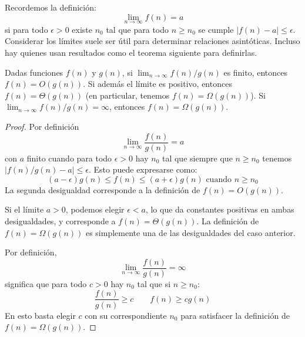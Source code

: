   Recordemos la definición:
  \begin{equation*}
    \lim_{n \rightarrow \infty} f(n) = a
  \end{equation*}
  si para todo \(\epsilon > 0\) existe \(n_0\)
  tal que para todo \(n \ge n_0\)
  se cumple \(\lvert f(n) - a \rvert \le \epsilon\).
  Considerar los límites suele ser útil
  para determinar relaciones asintóticas.
  Incluso hay quienes usan resultados como el teorema siguiente
  para definirlas.
  \begin{theorem}
    \label{theo:limite-O-Omega}
    Dadas funciones \(f(n)\) y \(g(n)\),
    si \(\lim_{n \rightarrow \infty} f(n) / g(n)\) es finito,
    entonces \(f(n) = O(g(n))\).
    Si además el límite es positivo,
    entonces \(f(n) = \Theta(g(n))\)
    (en particular,
     tenemos \(f(n) = \Omega(g(n))\)).
     Si \(\lim_{n \rightarrow \infty} f(n) / g(n) = \infty\),
     entonces \(f(n) = \Omega(g(n))\).
  \end{theorem}
  \begin{proof}
    Por definición
    \begin{equation*}
      \lim_{n \rightarrow \infty} \frac{f(n)}{g(n)} = a
    \end{equation*}
    con \(a\) finito
    cuando para todo \(\epsilon > 0\)
    hay \(n_0\) tal que siempre que \(n \ge n_0\) tenemos
    \(\lvert f(n) / g(n) - a \rvert \le \epsilon\).
    Esto puede expresarse como:
    \begin{equation*}
      (a - \epsilon) g(n) \le f(n) \le	(a + \epsilon) g(n)
	\text{\ cuando\ } n \ge n_0
    \end{equation*}
    La segunda desigualdad corresponde a la definición
    de \(f(n) = O(g(n))\).

    Si el límite \(a > 0\),
    podemos elegir \(\epsilon < a\),
    lo que da constantes positivas en ambas desigualdades,
    y corresponde a \(f(n) = \Theta(g(n))\).
    La definición de \(f(n) = \Omega(g(n))\)
    es simplemente una de las desigualdades del caso anterior.

    Por definición,
    \begin{equation*}
      \lim_{n \rightarrow \infty} \frac{f(n)}{g(n)}
	= \infty
    \end{equation*}
    significa que para todo \(c > 0\) hay \(n_0\)
    tal que si \(n \ge n_0\):
    \begin{equation*}
      \frac{f(n)}{g(n)}
	\ge c
      \qquad
      f(n)
	\ge c g(n)
    \end{equation*}
    En esto basta elegir \(c\) con su correspondiente \(n_0\)
    para satisfacer la definición de \(f(n) = \Omega(g(n))\).
  \end{proof}

